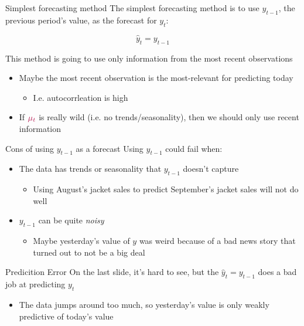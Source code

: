 \documentclass[aspectratio=169,t,11pt,table]{beamer}
\begin{document}
\begin{frame}{Simplest forecasting method}
  The \alert{simplest} forecasting method is to use $y_{t-1}$, the previous period's value, as the forecast for $y_t$:

  $$
    \hat{y}_t = y_{t-1}
  $$
  
  This method is going to use only information from the most recent observations
  \begin{itemize}
    \item Maybe the most recent observation is the most-relevant for predicting today
    \begin{itemize}
      \item I.e. autocorrleation is high
    \end{itemize}
    
    \item If ${\color[HTML]{B3114B} \mu_t}$ is really wild (i.e. no trends/seasonality), then we should only use recent information
  \end{itemize}
\end{frame}

\begin{frame}{Cons of using $y_{t-1}$ as a forecast}
  Using $y_{t-1}$ could fail when:
  \begin{itemize}
    \item The data has \alert{trends} or \alert{seasonality} that $y_{t-1}$ doesn't capture
    \begin{itemize}
      \item Using August's jacket sales to predict September's jacket sales will not do well
    \end{itemize}

    \pause
    \item $y_{t-1}$ can be quite \emph{noisy} 
    \begin{itemize}
      \item Maybe yesterday's value of $y$ was weird because of a bad news story that turned out to not be a big deal
    \end{itemize}
  \end{itemize}
\end{frame}


\begin{frame}{Predicition Error}
  On the last slide, it's hard to see, but the $\hat{y}_t = y_{t-1}$ does a bad job at predicting $y_t$
  \begin{itemize}
    \item The data jumps around too much, so yesterday's value is only weakly predictive of today's value
  \end{itemize}
\end{frame}
\end{document}
